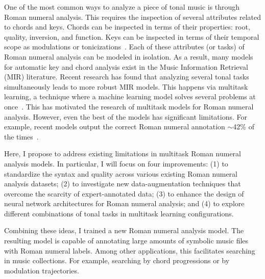 
One of the most common ways to analyze a piece of tonal
music is through Roman numeral analysis. This requires the
inspection of several attributes related to chords and keys.
Chords can be inspected in terms of their properties: root,
quality, inversion, and function. Keys can be inspected in
terms of their temporal scope as modulations or
tonicizations~\parencite{napoles_lopez2020local}. Each of
these attributes (or tasks) of Roman numeral analysis can be
modeled in isolation. As a result, many models for automatic
key and chord analysis exist in the Music Information
Retrieval (MIR) literature. Recent research has found that
analyzing several tonal tasks simultaneously leads to more
robust MIR models. This happens via multitask learning, a
technique where a machine learning model solves several
problems at once~\parencite{ruder2017overview}. This has
motivated the research of multitask models for Roman numeral
analysis. However, even the best of the models has
significant limitations. For example, recent models output
the correct Roman numeral annotation $\sim$42\% of the
times~\parencite{chen2021attend, micchi2020not}.

Here, I propose to address existing limitations in multitask
Roman numeral analysis models. In particular, I will focus
on four improvements: (1) to standardize the syntax and
quality across various existing Roman numeral analysis
datasets; (2) to investigate new data-augmentation
techniques that overcome the scarcity of expert-annotated
data; (3) to enhance the design of neural network
architectures for Roman numeral analysis; and (4) to explore
different combinations of tonal tasks in multitask learning
configurations.

Combining these ideas, I trained a new Roman numeral
analysis model. The resulting model is capable of annotating
large amounts of symbolic music files with Roman numeral
labels. Among other applications, this facilitates searching
in music collections. For example, searching by chord
progressions or by modulation trajectories.
